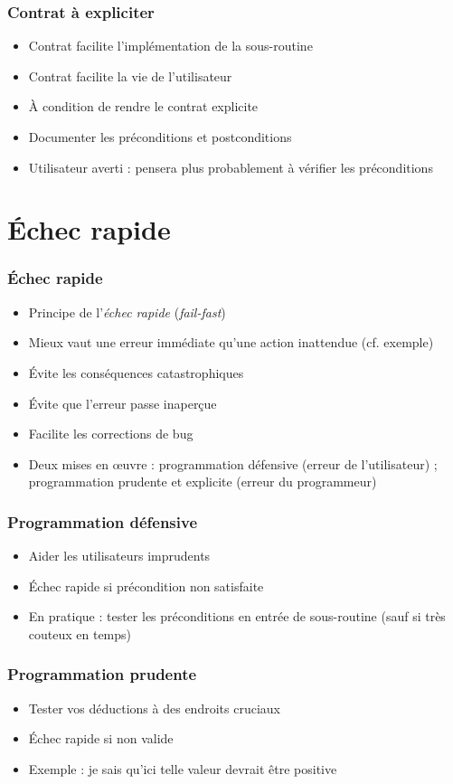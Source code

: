 \documentclass[english, french]{beamer}
\begin{document}
\begin{frame}
	\frametitle{Contrat à expliciter}
	\begin{itemize}
		\item Contrat facilite l’implémentation de la sous-routine
		\item Contrat facilite la vie de l’utilisateur
		\item À condition de rendre le contrat explicite
		\item Documenter les préconditions et postconditions
		\item Utilisateur averti : pensera plus probablement à vérifier les préconditions
	\end{itemize}
\end{frame}

\section{Échec rapide}
\begin{frame}
	\frametitle{Échec rapide}
	\begin{itemize}
		\item Principe de l’\emph{échec rapide} (\emph{fail-fast})
		\item Mieux vaut une erreur immédiate qu’une action inattendue (cf. exemple)
		\item Évite les conséquences catastrophiques
		\item Évite que l’erreur passe inaperçue
		\item Facilite les corrections de bug
		\item Deux mises en œuvre : programmation défensive (erreur de l’utilisateur) ; programmation prudente et explicite (erreur du programmeur)
	\end{itemize}
\end{frame}

\begin{frame}
	\frametitle{Programmation défensive}
	\begin{itemize}
		\item Aider les utilisateurs imprudents
		\item Échec rapide si précondition non satisfaite
		\item En pratique : tester les préconditions en entrée de sous-routine {\tiny (sauf si très couteux en temps)}
	\end{itemize}
\end{frame}

\begin{frame}
	\frametitle{Programmation prudente}
	\begin{itemize}
		\item Tester vos déductions à des endroits cruciaux 
		\item Échec rapide si non valide
		\item Exemple : je sais qu’ici telle valeur devrait être positive
	\end{itemize}
\end{frame}
\end{document}
